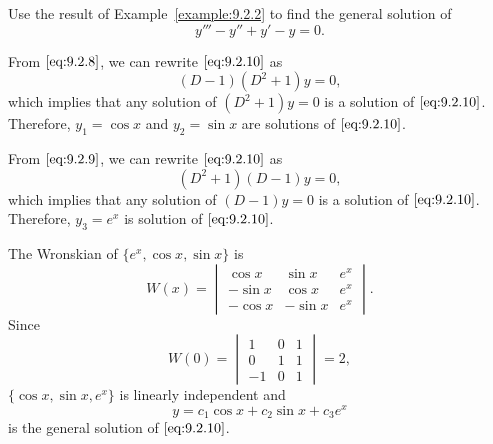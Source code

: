 \documentclass{ximera}
\begin{document}
\begin{example}\label{example:9.2.3}
Use the result of Example~\ref{example:9.2.2} to find the general
solution of
\begin{equation} \label{eq:9.2.10}
y'''-y''+y'-y=0.
\end{equation}


\begin{explanation}
From $\eqref{eq:9.2.8}$, we can rewrite $\eqref{eq:9.2.10}$ as
$$
(D-1)(D^2+1)y=0,
$$
which implies that any solution of $(D^2+1)y=0$ is a solution of
$\eqref{eq:9.2.10}$. Therefore, $y_1=\cos x$ and $y_2=\sin x$ are solutions of $\eqref{eq:9.2.10}$.


From $\eqref{eq:9.2.9}$, we can rewrite $\eqref{eq:9.2.10}$ as
$$
(D^2+1)(D-1)y=0,
$$
which implies that any solution of $(D-1)y=0$ is a solution of
$\eqref{eq:9.2.10}$. Therefore, $y_3=e^x$ is solution of $\eqref{eq:9.2.10}$.

The Wronskian of $\{e^x,\cos x,\sin x\}$ is
$$
W(x)=\begin{vmatrix}\cos x&\sin x&e^x\\-\sin x&\cos x&e^x\\
-\cos x&-\sin x&e^x\end{vmatrix}.
$$
Since
$$
W(0)=\begin{vmatrix}1&0&1\\0&1&1\\
-1&0&1\end{vmatrix}=2,
$$
 $\{\cos x,\sin x,e^x\}$ is linearly independent
and
$$
y=c_1\cos x+c_2\sin x+c_3e^x
$$
is the general solution of $\eqref{eq:9.2.10}$.
\end{explanation}
\end{example}
\end{document}
